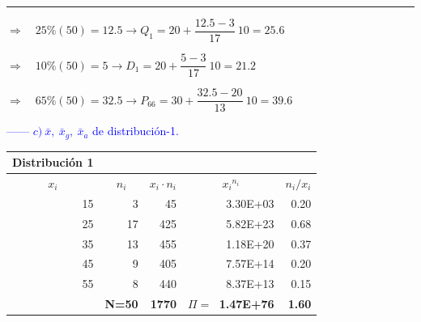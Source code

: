 {\color{gris}\hrule}
	
\vspace{4mm} %

$\Rightarrow \quad  25\% (50)=12.5 \to Q_1=20+ \dfrac{12.5-3}{17}\ 10=25.6$

$\Rightarrow \quad 10\% (50)=5 \to D_1=20+\dfrac{5-3}{17}\ 10=21.2$

$\Rightarrow \quad 65\% (50)=32.5 \to P_{66}=30+\dfrac{32.5-20}{13}\ 10=39.6$

\textcolor{blue}{------ $c)\ \bar x,\ \bar x_g,\ \bar x_a$ de distribución-1.}

\begin{table}[H]
\footnotesize
\centering
\begin{tabular}{rrrrr}
\multicolumn{1}{l}{\textbf{Distribución 1}} & \multicolumn{1}{l}{\textbf{}} & \multicolumn{1}{l}{\textbf{}} & \multicolumn{1}{l}{\textbf{}} & \multicolumn{1}{l}{\textbf{}} \\ \hline
\multicolumn{1}{|c|}{\textbf{$x_i$}} & \multicolumn{1}{c|}{\textbf{$n_i$}} & \multicolumn{1}{c|}{\textbf{$x_i \cdot n_i$}} & \multicolumn{1}{c|}{\textbf{${x_i}^{n_i}$}} & \multicolumn{1}{c|}{\textbf{$n_i / x_i$}} \\ \hline
\multicolumn{1}{|r|}{15} & \multicolumn{1}{r|}{3} & \multicolumn{1}{r|}{45} & \multicolumn{1}{r|}{3.30E+03} & \multicolumn{1}{r|}{0.20} \\ \hline
\multicolumn{1}{|r|}{25} & \multicolumn{1}{r|}{17} & \multicolumn{1}{r|}{425} & \multicolumn{1}{r|}{5.82E+23} & \multicolumn{1}{r|}{0.68} \\ \hline
\multicolumn{1}{|r|}{35} & \multicolumn{1}{r|}{13} & \multicolumn{1}{r|}{455} & \multicolumn{1}{r|}{1.18E+20} & \multicolumn{1}{r|}{0.37} \\ \hline
\multicolumn{1}{|r|}{45} & \multicolumn{1}{r|}{9} & \multicolumn{1}{r|}{405} & \multicolumn{1}{r|}{7.57E+14} & \multicolumn{1}{r|}{0.20} \\ \hline
\multicolumn{1}{|r|}{55} & \multicolumn{1}{r|}{8} & \multicolumn{1}{r|}{440} & \multicolumn{1}{r|}{8.37E+13} & \multicolumn{1}{r|}{0.15} \\ \hline
\multicolumn{1}{r|}{\textbf{}} & \multicolumn{1}{r|}{\textbf{N=50}} & \multicolumn{1}{r|}{\textbf{1770}} & \multicolumn{1}{r|}{\textbf{$\Pi=\ $ 1.47E+76}} & \multicolumn{1}{r|}{\textbf{1.60}} \\ \cline{2-5} 
\end{tabular}
\end{table}

